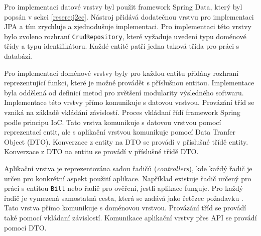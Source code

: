     Pro implementaci datové vrstvy byl použit framework Spring Data, který byl popsán v sekci \ref{resere:j2ee}. Nástroj přidává dodatečnou vrstvu pro implementaci JPA a tím zrychluje a zjednodušuje implementaci. Pro implementaci této vrstvy bylo zvoleno rozhraní \verb|CrudRepository|, které vyžaduje uvedení typu doménové třídy a typu identifikátoru. Každé entitě patří jedna taková třída pro práci s databází.
    
    Pro implementaci doménové vrstvy byly pro každou entitu přidány rozhraní reprezentující funkci, které je možné provádět s příslušnou entitou. Implementace byla oddělená od definicí metod pro zvětšení modularity výsledného softwaru. Implementace této vrstvy přímo komunikuje s datovou vrstvou. Provázání tříd se vzniká na základě vkládání závislostí. Proces vkládaní řídí framework Spring podle principu IoC. Tato vrstva komunikuje s datovou vrstvou pomocí reprezentací entit, ale s aplikační vrstvou komunikuje pomocí Data Tranfer Object (DTO). Konverzace z entity na DTO se provádí v příslušné třídě entity. Konverzace z DTO na entitu se provádí v příslušné třídě DTO.
    
    Aplikační vrstva je reprezentována sadou řadičů (\textit{controllers}), kde každý řadič je určen pro konkrétní aspekt použití aplikace. Například existuje řadič určený pro práci s entitou \verb|Bill| nebo řadič pro ověření, jestli aplikace funguje. Pro každý řadič je vymezená samostatná cesta, která se zadává jako řetězec požadavku \cite{http-request-components}. Tato vrstva přímo komunikuje s doménovou vrstvou. Provázání tříd se provádí také pomocí vkládaní závislostí. Komunikace aplikační vrstvy přes API se provádí pomocí DTO.
    
